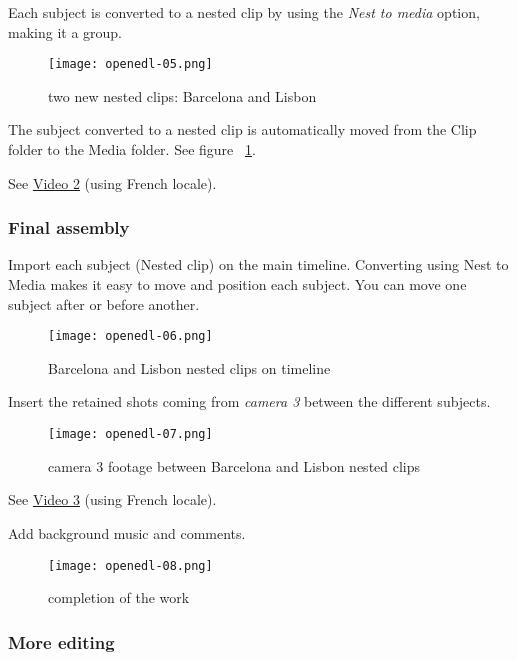 Each subject is converted to a nested clip by using the \textit{Nest to media} option, making it a group.

\begin{figure}[htpb]
	\centering
	\texttt{[image: openedl-05.png]}
	\caption{two new nested clips: Barcelona and Lisbon}
	\label{fig:openedl-05}
\end{figure}

The subject converted to a nested clip is automatically moved from the Clip folder to the Media folder. See figure ~\ref{fig:openedl-05}.

See \href{https://youtu.be/kQ7sGq0o44U}{Video 2} (using French locale).

\subsubsection*{Final assembly}
\label{ssub:final_assembly}

Import each subject (Nested clip) on the main timeline. Converting using Nest to Media makes it easy to move and position each subject. You can move one subject after or before another.

\begin{figure}[htpb]
	\centering
	\texttt{[image: openedl-06.png]}
	\caption{Barcelona and Lisbon nested clips on timeline}
	\label{fig:openedl-06}
\end{figure}

Insert the retained shots coming from \textit{camera 3} between the different subjects.

\begin{figure}[htpb]
	\centering
	\texttt{[image: openedl-07.png]}
	\caption{camera 3 footage between Barcelona and Lisbon nested clips}
	\label{fig:openedl-07}
\end{figure}

See \href{https://youtu.be/9Hz0a-1i3I8}{Video 3} (using French locale).

Add background music and comments.

\begin{figure}[htpb]
	\centering
	\texttt{[image: openedl-08.png]}
	\caption{completion of the work}
	\label{fig:openedl-08}
\end{figure}

\subsubsection*{More editing}
\label{ssub:more_editing}

